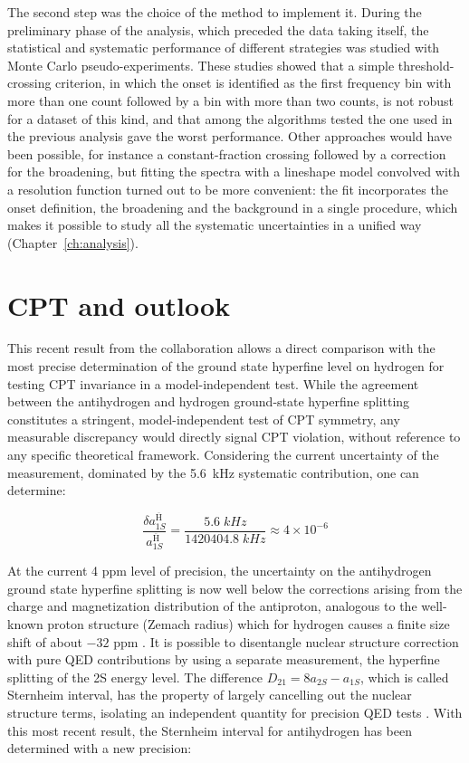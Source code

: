 The second step was the choice of the method to implement it. During the preliminary phase of the analysis, which preceded the data taking itself, the statistical and systematic performance of different strategies was studied with Monte Carlo pseudo-experiments. These studies showed that a simple threshold-crossing criterion, in which the onset is identified as the first frequency bin with more than one count followed by a bin with more than two counts, is not robust for a dataset of this kind, and that among the algorithms tested the one used in the previous analysis gave the worst performance. Other approaches would have been possible, for instance a constant-fraction crossing followed by a correction for the broadening, but fitting the spectra with a lineshape model convolved with a resolution function turned out to be more convenient: the fit incorporates the onset definition, the broadening and the background in a single procedure, which makes it possible to study all the systematic uncertainties in a unified way (Chapter~\ref{ch:analysis}).

\section{CPT and outlook} \label{sec:outlookthesis}

This recent result from the \ALPHA collaboration allows a direct comparison with the most precise determination of the ground state hyperfine level on hydrogen for testing CPT invariance in a model-independent test. While the agreement between the antihydrogen and hydrogen ground-state hyperfine splitting constitutes a stringent, model-independent test of CPT symmetry, any measurable discrepancy would directly signal CPT violation, without reference to any specific theoretical framework. Considering the current uncertainty of the measurement, dominated by the \SI{5.6}{\kilo \hertz} systematic contribution, one can determine:

\begin{equation}
\frac{\delta a_{1S}^{\overline{\mathrm{H}}}}{a_{1S}^{\overline{\mathrm{H}}}} =\frac{5.6 \; kHz}{1420404.8 \; kHz} \approx 4 \times 10^{-6} 
\end{equation}

At the current 4 ppm level of precision, the uncertainty on the antihydrogen ground state hyperfine splitting is now well below the corrections arising from the charge and magnetization distribution of the antiproton, analogous to the well-known proton structure (Zemach radius) which for hydrogen causes a finite size shift of about $-32$ ppm \cite{Widmann_2022,PhysRevA.78.022517}. It is possible to disentangle nuclear structure correction with pure QED contributions by using a separate measurement, the hyperfine splitting of the 2S energy level. The difference $D_{21} = 8 a_{2S} - a_{1S}$, which is called Sternheim interval, has the property of largely cancelling out the nuclear structure terms, isolating an independent quantity for precision QED tests \cite{Sternheim:1963zz}. With this most recent result, the Sternheim interval for antihydrogen has been determined with a new precision:

